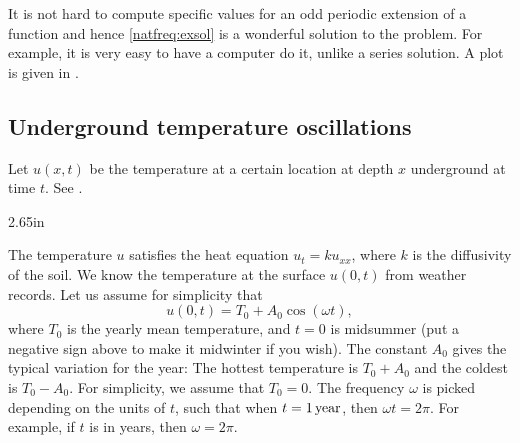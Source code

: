 \begin{example}
It is not hard to compute specific values
for an odd periodic extension of a function and
hence \eqref{natfreq:exsol} is a wonderful solution to the problem.
For example, it is very easy to have a computer do it, unlike a series solution.
A plot is given in .
\begin{myfig}
\capstart
{}
\caption{Plot of $y(x,t) = \frac{F(x+t) + F(x-t)}{2} + \left( \cos (x) -
\frac{\cos (1) - 1}{\sin (1)} \sin (x) -1 \right) \cos (t)$.%
\label{natfreq:forcedvibfig}}
\end{myfig}
\end{example}

\subsection{Underground temperature oscillations}

Let $u(x,t)$ be the temperature at a certain location at depth $x$
underground at time $t$.  See .

\begin{mywrapfig}{2.65in}
\capstart
{}
\caption{Underground temperature.\label{sps:groundtempfig}}
\end{mywrapfig}

The temperature $u$ satisfies the heat equation $u_t = ku_{xx}$, where $k$
is the diffusivity of the soil.
We know the temperature at the surface $u(0,t)$ from weather
records.  Let us assume for simplicity that
\begin{equation*}
u(0,t) = T_0 + A_0 \cos (\omega t) ,
\end{equation*}
where $T_0$ is the yearly mean
temperature, and
$t=0$ is midsummer (put
a negative sign above to make it midwinter if you wish).
The constant $A_0$ gives 
the typical variation for the year:
The hottest temperature is $T_0 + A_0$ and the coldest is $T_0 - A_0$.
For simplicity, we assume that $T_0 = 0$.
The frequency $\omega$ is picked depending on the units of $t$, such that
when $t=\unit[1]{year}$, then $\omega t = 2 \pi$.  For example, if $t$ is
in years, then $\omega = 2\pi$.

